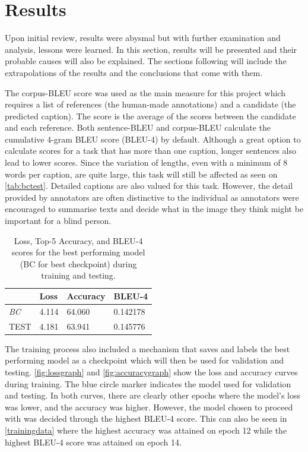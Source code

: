\documentclass[11pt,a4paper]{article}
\begin{document}
\section{Results}
\label{sec:results}

Upon initial review, results were abysmal but with further examination and analysis, lessons were learned. In this section, results will be presented and their probable causes will also be explained. The sections following will include the extrapolations of the results and the conclusions that come with them. 

The corpus-BLEU score was used as the main measure for this project which requires a list of references (the human-made annotations) and a candidate (the predicted caption). The score is the average of the scores between the candidate and each reference. Both sentence-BLEU and corpus-BLEU calculate the cumulative 4-gram BLEU score (BLEU-4) by default. Although a great option to calculate scores for a task that has more than one caption, longer sentences also lead to lower scores. Since the variation of lengths, even with a minimum of 8 words per caption, are quite large, this task will still be affected as seen on \autoref{tab:bctest}. Detailed captions are also valued for this task. However, the detail provided by annotators are often distinctive to the individual as annotators were encouraged to summarise texts and decide what in the image they think might be important for a blind person.

\begin{table}[ht]
\centering
\begin{tabular}{llll} 
\toprule
 & \textbf{Loss} & \textbf{Accuracy} & \textbf{BLEU-4} \\ 
\hline
\textit{BC} & 4.114 & 64.060 & 0.142178 \\
TEST & 4.181 & 63.941 & 0.145776 \\
\bottomrule
\end{tabular}
\vspace{2mm}
\caption{\label{tab:bctest}Loss, Top-5 Accuracy, and BLEU-4 scores for the best performing model (BC for best checkpoint) during training and testing.}
\end{table}

The training process also included a mechanism that saves and labels the best performing model as a checkpoint which will then be used for validation and testing. \autoref{fig:lossgraph} and \autoref{fig:accuracygraph} show the loss and accuracy curves during training. The blue circle marker indicates the model used for validation and testing. In both curves, there are clearly other epochs where the model’s loss was lower, and the accuracy was higher. However, the model chosen to proceed with was decided through the highest BLEU-4 score. This can also be seen in \autoref{trainingdata} where the highest accuracy was attained on epoch 12 while the highest BLEU-4 score was attained on epoch 14. 
\end{document}
